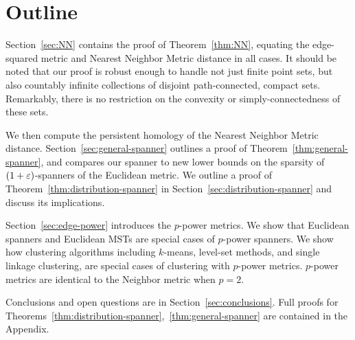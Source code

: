 \section{Outline}
%  
Section~\ref{sec:NN} contains the proof of Theorem~\ref{thm:NN},
equating the edge-squared metric and Nearest Neighbor Metric distance in
all cases. It should be noted that our proof is robust enough to handle not
just finite point sets, but also countably infinite collections of disjoint
path-connected, compact sets. Remarkably, there is no restriction on the convexity or
simply-connectedness of these sets.

We then compute the persistent homology of the Nearest Neighbor Metric
distance.  Section~\ref{sec:general-spanner} outlines a proof of
Theorem~\ref{thm:general-spanner}, and compares our spanner to new lower
bounds
on the sparsity of $(1+\varepsilon)$-spanners of the Euclidean metric.
We outline a proof of Theorem~\ref{thm:distribution-spanner} in
Section~\ref{sec:distribution-spanner} and discuss its implications.  

Section~\ref{sec:edge-power} introduces the $p$-power metrics. We show
that Euclidean spanners and Euclidean MSTs are special cases of
$p$-power spanners. We show how
clustering algorithms including $k$-means, level-set methods,
and single linkage clustering, are special cases of
clustering with $p$-power metrics. $p$-power metrics are identical to the
Neighbor metric when $p=2$.


Conclusions and open questions are in
Section~\ref{sec:conclusions}. Full proofs for
Theorems~\ref{thm:distribution-spanner},~\ref{thm:general-spanner}
are contained in the Appendix.

